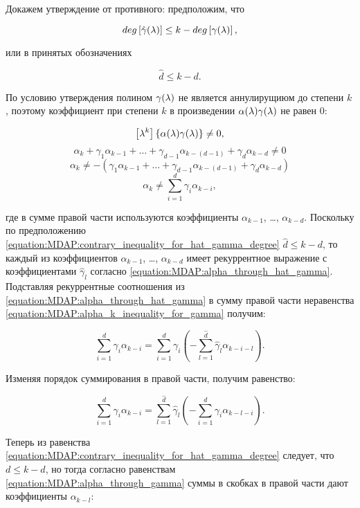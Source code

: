 \begin{statement}
\begin{enumerate}
\begin{enumerate}
					Докажем утверждение от противного: предположим, что

						$$ deg \left [ \hat\gamma (\lambda) \right ] \le k - deg \left [ \gamma (\lambda) \right ], $$

					или в принятых обозначениях

						\begin{equation} \label{equation:MDAP:contrary_inequality_for_hat_gamma_degree}
							\hat d \le k - d.
						\end{equation}

					По условию утверждения полином $\gamma (\lambda)$ не является аннулирущиюм до степени $k$, поэтому коэффициент при
					степени $k$ в произведении $\alpha (\lambda) \gamma (\lambda)$ не равен 0:

						$$ \left [ \lambda^{k} \right ] \left \{ \alpha (\lambda) \gamma (\lambda) \right \} \neq 0, $$
						$$ \alpha_{k} + \gamma_1 \alpha_{k-1} + \dots + \gamma_{d-1} \alpha_{k-(d-1)} + \gamma_d \alpha_{k-d} \neq 0 $$
						$$ \alpha_{k} \neq - \left ( \gamma_1 \alpha_{k-1} + \dots + \gamma_{d-1} \alpha_{k-(d-1)} + \gamma_d \alpha_{k-d} \right ) $$
						\begin{equation} \label{equation:MDAP:alpha_k_inequality_for_gamma}
							\alpha_k \neq \sum_{i=1}^{d} \gamma_i \alpha_{k-i},
						\end{equation}

					где в сумме правой части используются коэффициенты $\alpha_{k-1}$, \dots, $\alpha_{k-d}$. Поскольку по предположению
					\eqref{equation:MDAP:contrary_inequality_for_hat_gamma_degree} $\hat d \le k - d$, то каждый из коэффициентов $\alpha_{k-1}$,
					\dots, $\alpha_{k-d}$ имеет рекуррентное выражение с коэффициентами $\hat \gamma_l$ согласно
					\eqref{equation:MDAP:alpha_through_hat_gamma}. Подставляя рекуррентные соотношения из
					\eqref{equation:MDAP:alpha_through_hat_gamma} в сумму правой части неравенства
					\eqref{equation:MDAP:alpha_k_inequality_for_gamma} получим:

						$$ \sum_{i=1}^{d} \gamma_i \alpha_{k-i} = \sum_{i=1}^{d} \gamma_i \left ( - \sum_{l=1}^{\hat d} \hat\gamma_l \alpha_{k-i-l} \right ). $$

					Изменяя порядок суммирования в правой части, получим равенство:

						$$ \sum_{i=1}^{d} \gamma_i \alpha_{k-i} = \sum_{l=1}^{\hat d} \hat\gamma_l \left ( - \sum_{i=1}^{d} \gamma_i  \alpha_{k-l-i} \right ). $$

					Теперь из равенства \eqref{equation:MDAP:contrary_inequality_for_hat_gamma_degree} следует, что $d \le k - \hat d$, но
					тогда согласно равенствам \eqref{equation:MDAP:alpha_through_gamma} суммы в скобках в правой части дают коэффициенты
					$\alpha_{k-l}$:
		

\end{enumerate}
\end{enumerate}
\end{statement}
